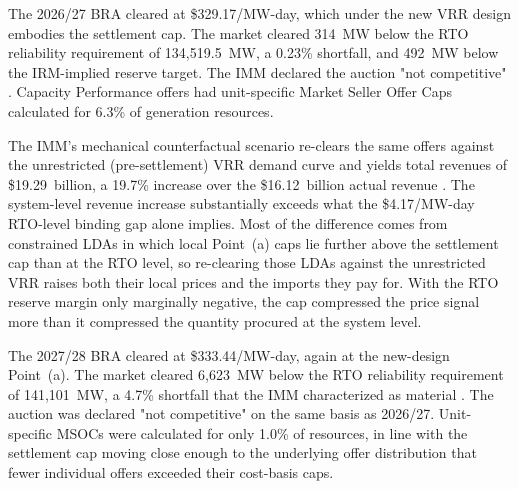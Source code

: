 
\label{sec:case_studies}

\label{subsec:case_2026}%
The 2026/27 BRA cleared at \$329.17/MW-day, which under the new VRR
design embodies the settlement cap. The market cleared 314~MW below
the RTO reliability requirement of 134{,}519.5~MW, a 0.23\% shortfall,
and 492~MW below the IRM-implied reserve target. The IMM declared the
auction "not competitive" \citep{MonitoringAnalytics2025_sotm}.
Capacity Performance offers had unit-specific Market Seller Offer Caps
calculated for 6.3\% of generation resources.

The IMM's mechanical counterfactual scenario re-clears the same offers
against the unrestricted (pre-settlement) VRR demand curve and yields
total revenues of \$19.29~billion, a 19.7\% increase over the
\$16.12~billion actual revenue \citep{MonitoringAnalytics2025_sotm}.
The system-level revenue increase substantially exceeds what the
\$4.17/MW-day RTO-level binding gap alone implies. Most of the
difference comes from constrained LDAs in
which local Point~(a) caps lie further above the settlement cap than
at the RTO level, so re-clearing those LDAs against the unrestricted
VRR raises both their local prices and the imports they pay for. With
the RTO reserve margin only marginally negative, the cap compressed
the price signal more than it compressed the quantity procured at the
system level.

\label{subsec:case_2027}%
The 2027/28 BRA cleared at \$333.44/MW-day, again at the new-design
Point~(a). The market cleared 6{,}623~MW below the RTO reliability
requirement of 141{,}101~MW, a 4.7\% shortfall that the IMM
characterized as material
\citep{PJM2025_bra2728_release, PJM2026_shortfall_report}. The auction was declared "not
competitive" on the same basis as 2026/27. Unit-specific MSOCs were
calculated for only 1.0\% of resources, in line with the
settlement cap moving close enough to the underlying offer
distribution that fewer individual offers exceeded their cost-basis
caps.

